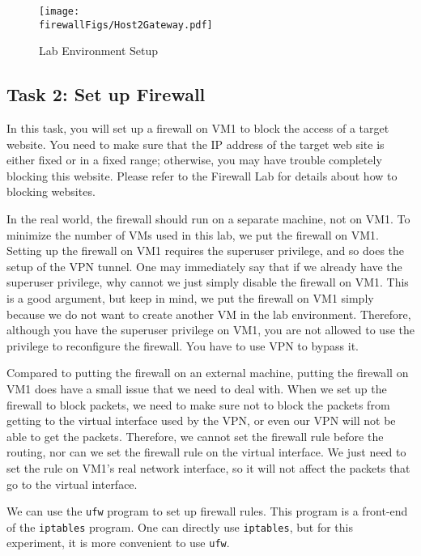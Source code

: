 \begin{figure}[htb]
  \begin{center}
    \texttt{[image: \\firewallFigs/Host2Gateway.pdf]}
  \end{center}
  \caption{Lab Environment Setup}
  \label{vpn_firewall:fig:labsetup}
\end{figure}



\subsection{Task 2: Set up Firewall}

In this task, you will set up a firewall on VM1 to block the access of a target website. You
need to make sure that the IP address of the target web site is either fixed or in a fixed
range; otherwise, you may have trouble completely blocking this website. Please refer to the
Firewall Lab for details about how to blocking websites.

In the real world, the firewall should run on a separate machine, not on VM1. To minimize the number of VMs
used in this lab, we put the firewall on VM1. Setting up the firewall on VM1 requires the superuser
privilege, and so does the setup of the VPN tunnel. One may immediately say that if we already
have the superuser privilege, why cannot we just simply disable the firewall on VM1. This is a good argument,
but keep in mind, we put the firewall on VM1 simply because we do not want to create another VM
in the lab environment. Therefore, although you have the superuser privilege on VM1, you are
not allowed to use the privilege to reconfigure the firewall. You have to use VPN to bypass
it.

Compared to putting the firewall on an external machine, putting the firewall on VM1 does have
a small issue that we need to deal with. When we set up the firewall to block packets, we need
to make sure not to block the packets from getting to the virtual interface used by the VPN, or even our
VPN will not be able to get the packets.  Therefore, we cannot set the firewall rule before the
routing, nor can we set the firewall rule on the virtual interface. We just need to set the
rule on VM1's real network interface, so it will not affect the packets that go to the virtual
interface.  

We can use the \texttt{ufw} program to set up firewall rules. This program is a
front-end of the \texttt{iptables} program. One can directly use
\texttt{iptables}, but for this experiment, it is more convenient to use \texttt{ufw}.


